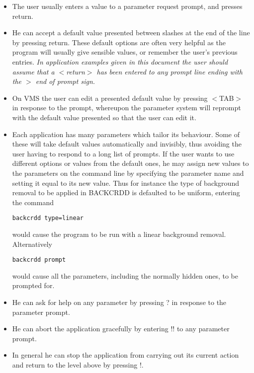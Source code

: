 \begin{itemize}
\item The user usually enters a value to a parameter request prompt, and presses
return.
\item He can accept a default value presented between slashes at the end
of the line by pressing return. These default options are often very
helpful as the program will usually give sensible values, or remember the
user's previous entries. {\em In application examples given in this document
the user should assume that a $<$return$>$ has been entered to any prompt line
ending with the $>$ end of prompt sign.}
\item On VMS the user can edit a presented default value by pressing $<$TAB$>$
in response to the prompt, whereupon the parameter system will reprompt with
the default value presented so that the user can edit it.
\item Each application has many parameters which tailor its behaviour. Some of
these will take default values automatically and invisibly, thus avoiding the
user having to respond to a long list of prompts. If the user wants to use
different options or values from the default ones, he may assign new values to
the parameters on the command line by specifying the parameter name and setting
it equal to its new value. Thus for instance the type of background removal to
be applied in BACKCRDD is defaulted to be uniform, entering the command
\begin{small}
\begin{verbatim}
backcrdd type=linear
\end{verbatim}
\end{small}
would cause the program to be run with a linear background removal. 
Alternatively 
\begin{small}
\begin{verbatim}
backcrdd prompt
\end{verbatim}
\end{small}
would cause all the parameters, including the normally hidden ones, to be
prompted for.
\item He can ask for help on any parameter by pressing ? in response to
the parameter prompt. 
\item He can abort the application gracefully by entering !! to any 
parameter prompt.
\item In general he can stop the application from carrying out its current
action and return to the level above by pressing !. 
\end{itemize}

